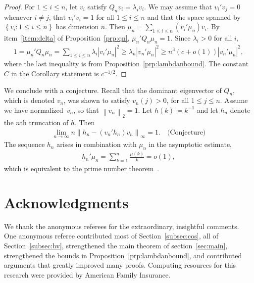 \documentclass[12pt,reqno]{article}
\newcommand{\abs}[1]{\ensuremath{\left|{#1}\right|}}
\newcommand{\norm}[1]{\ensuremath{\left\|{#1}\right\|}}
\newcommand{\set}[1]{\ensuremath{\left\{{#1}\right\}}}
\begin{document}
\begin{proof}
For $1\leq i\leq n$, let $v_i$ satisfy $Q_nv_i = \lambda_iv_i$. We may assume that $v_i'v_j=0$ whenever $i\not=j$, that $v_i'v_i=1$ for all $1\leq i\leq n$ and that the space spanned
by $\set{v_i:1\leq i\leq n}$ has dimension $n$.  Then $\mu_n = \sum_{1\leq i\leq n}(v_i'\mu_n) v_i$. By item~\ref{item:delta} of Proposition~\ref{prp:qn}, $\mu_n'Q_n\mu_n=1$. Since
$\lambda_i>0$ for all $i$,
\begin{align*}
1  = \mu_n'Q_n\mu_n = \sum_{1\leq i\leq n} \lambda_i \abs{ v_{i}'\mu_n}^2 \geq \lambda_n \abs{v_n'\mu_n}^2 \geq n^{3}(c+o(1)) \abs{v_n'\mu_n}^2,
\end{align*}
where the last inequality is from Proposition~\ref{prp:lambdanbound}.  The constant $C$ in the Corollary statement is $c^{-1/2}$.
\end{proof}

We conclude with a conjecture.
Recall that the dominant eigenvector of $Q_n$, which is denoted $v_n$, was shown to satisfy $v_n(j)>0$, for all $1\leq j\leq n$.
Assume we have normalized~$v_n$, so that $\norm{v_n}_2=1$. Let $h(k)\coloneqq k^{-1}$ and let $h_n$ denote the $n$th truncation of $h$. Then
\begin{align*}
\lim_{n\rightarrow\infty}n\norm{h_n-(v_n'h_n) v_n}_{\infty}=1. \quad\text{(Conjecture)}
\end{align*}
The sequence $h_n$ arises in combination with $\mu_n$ in the asymptotic estimate,
\begin{align*}
h_n'\mu_n = \sum_{k=1}^{n} \frac{\mu(k)}{k} = o(1),
\end{align*}
which is equivalent to the prime number theorem~\cite{shapiro1949some}.


\section{Acknowledgments}
We thank the anonymous referees for the extraordinary, insightful comments. One anonymous referee 
contributed most of Section~\ref{subsec:cos}, all of Section~\ref{subsec:bv}, strengthened the main theorem of section~\ref{sec:main}, strengthened the bounds in
Proposition~\ref{prp:lambdanbound}, and
contributed arguments that greatly improved many proofs.
Computing resources for this research were provided by American Family Insurance.
\end{document}
